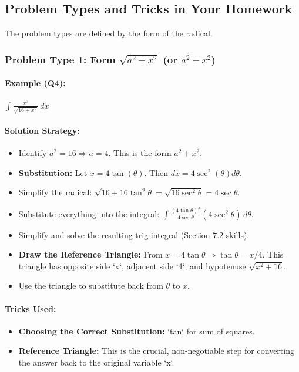 \documentclass{article}
\begin{document}
\subsection{Problem Types and Tricks in Your Homework}
The problem types are defined by the form of the radical.
\subsubsection{Problem Type 1: Form $ \sqrt{a^2+x^2} $ (or $a^2+x^2$)}
\paragraph{Example (Q4):} $ \int \frac{x^3}{\sqrt{16+x^2}} \,dx $
\paragraph{Solution Strategy:}
\begin{itemize}
    \item Identify $a^2=16 \Rightarrow a=4$. This is the form $a^2+x^2$.
    \item \textbf{Substitution:} Let $x = 4\tan(\theta)$. Then $dx=4\sec^2(\theta)d\theta$.
    \item Simplify the radical: $\sqrt{16+16\tan^2\theta} = \sqrt{16\sec^2\theta} = 4\sec\theta$.
    \item Substitute everything into the integral: $\int \frac{(4\tan\theta)^3}{4\sec\theta} (4\sec^2\theta) \,d\theta$.
    \item Simplify and solve the resulting trig integral (Section 7.2 skills).
    \item \textbf{Draw the Reference Triangle:} From $x=4\tan\theta \Rightarrow \tan\theta = x/4$. This triangle has opposite side `x`, adjacent side `4`, and hypotenuse $\sqrt{x^2+16}$.
    \item Use the triangle to substitute back from $\theta$ to $x$.
\end{itemize}
\paragraph{Tricks Used:}
\begin{itemize}
    \item \textbf{Choosing the Correct Substitution:} `tan` for sum of squares.
    \item \textbf{Reference Triangle:} This is the crucial, non-negotiable step for converting the answer back to the original variable `x`.
\end{itemize}
\end{document}
